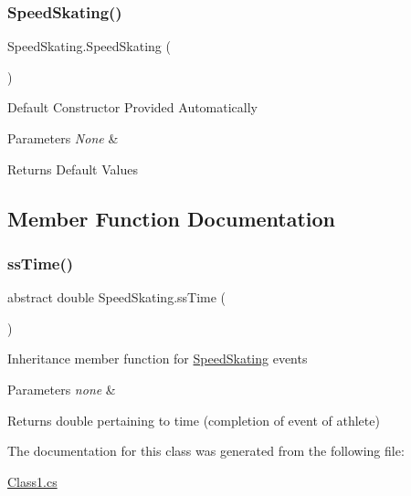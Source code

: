 \subsubsection{\texorpdfstring{Speed\+Skating()}{SpeedSkating()}}
{\footnotesize\ttfamily Speed\+Skating.\+Speed\+Skating (\begin{DoxyParamCaption}{ }\end{DoxyParamCaption})\hspace{0.3cm}{\ttfamily [inline]}}

Default Constructor Provided Automatically 
\begin{DoxyParams}{Parameters}
{\em None} & \\
\hline
\end{DoxyParams}
\begin{DoxyReturn}{Returns}
Default Values 
\end{DoxyReturn}


\subsection{Member Function Documentation}
\mbox{\label{classSpeedSkating_ac0f08d69e63d02979947da25f764f08e}} 
\subsubsection{\texorpdfstring{ss\+Time()}{ssTime()}}
{\footnotesize\ttfamily abstract double Speed\+Skating.\+ss\+Time (\begin{DoxyParamCaption}{ }\end{DoxyParamCaption})\hspace{0.3cm}{\ttfamily [pure virtual]}}

Inheritance member function for \hyperlink{classSpeedSkating}{Speed\+Skating} events 
\begin{DoxyParams}{Parameters}
{\em none} & \\
\hline
\end{DoxyParams}
\begin{DoxyReturn}{Returns}
double pertaining to time (completion of event of athlete) 
\end{DoxyReturn}


The documentation for this class was generated from the following file\+:\begin{DoxyCompactItemize}
\item 
\hyperlink{Class1_8cs}{Class1.\+cs}\end{DoxyCompactItemize}
